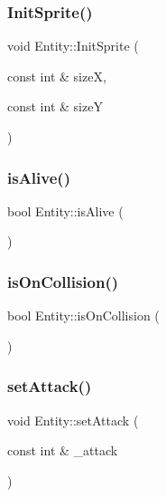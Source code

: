 \mbox{\label{class_entity_a50c5368cf01cc0a6588a840a10395e8d}} 
\subsubsection{\texorpdfstring{Init\+Sprite()}{InitSprite()}}
{\footnotesize\ttfamily void Entity\+::\+Init\+Sprite (\begin{DoxyParamCaption}\item[{const int \&}]{sizeX,  }\item[{const int \&}]{sizeY }\end{DoxyParamCaption})}

\mbox{\label{class_entity_ab0986ba7a1b24f022b5623781050c0f1}} 
\subsubsection{\texorpdfstring{is\+Alive()}{isAlive()}}
{\footnotesize\ttfamily bool Entity\+::is\+Alive (\begin{DoxyParamCaption}{ }\end{DoxyParamCaption})\hspace{0.3cm}{\ttfamily [inline]}}

\mbox{\label{class_entity_aafb90196148c49221f62e995b17ccbce}} 
\subsubsection{\texorpdfstring{is\+On\+Collision()}{isOnCollision()}}
{\footnotesize\ttfamily bool Entity\+::is\+On\+Collision (\begin{DoxyParamCaption}{ }\end{DoxyParamCaption})\hspace{0.3cm}{\ttfamily [inline]}}

\mbox{\label{class_entity_a990ea980305c4cfaaf125bf17c7eec0f}} 
\subsubsection{\texorpdfstring{set\+Attack()}{setAttack()}}
{\footnotesize\ttfamily void Entity\+::set\+Attack (\begin{DoxyParamCaption}\item[{const int \&}]{\+\_\+attack }\end{DoxyParamCaption})\hspace{0.3cm}{\ttfamily [inline]}}

